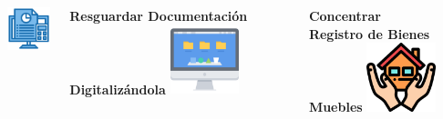 \documentclass[xcolor=dvipsnames, xcolor=table]{beamer}
\begin{document}
\begin{frame}
\begin{columns}
\begin{column}{0.3\textwidth}
        \includegraphics[width=20mm]{036-system}
      \end{column}
      \begin{column}{0.3\textwidth}
        \centering\textbf{\textcolor{color3}{\small Resguardar Documentación Digitalizándola}\vspace{3mm}}
        \vspace{10mm}
        \includegraphics[width=20mm]{035-monitor}
      \end{column}
      \begin{column}{0.3\textwidth}
        \centering\textbf{\textcolor{color3}{\small Concentrar\\Registro de Bienes Muebles}\vspace{3mm}}
        \vspace{10mm}
        \includegraphics[width=20mm]{031-house}
      \end{column}      
    \end{columns}
\end{frame}
\end{document}
